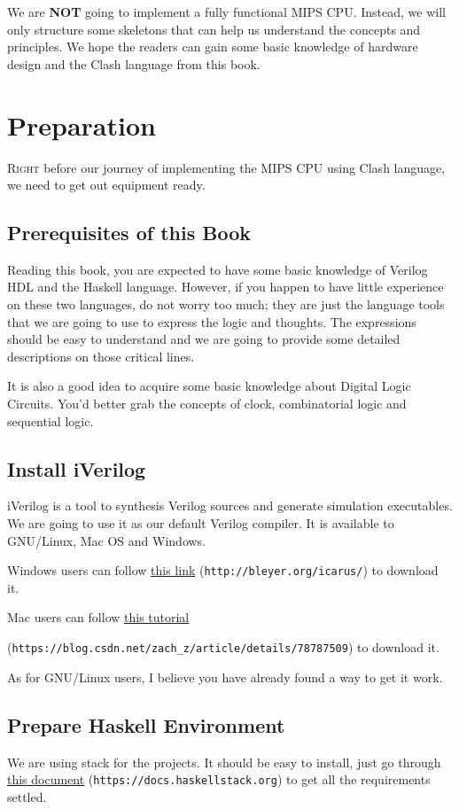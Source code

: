 \documentclass[a4paper,12pt, oneside]{book}
\begin{document}
We are \textbf{NOT} going to implement a fully functional MIPS CPU. Instead, we will only structure some skeletons that can help us understand the concepts and principles. We hope the readers can gain some basic knowledge of hardware design and the Clash language from this book.

\tableofcontents

\mainmatter
\chapter{Preparation}
\lettrine{R}{ight} before our journey of implementing the MIPS CPU using Clash language, we need to get out equipment ready.
\section{Prerequisites of this Book}
Reading this book, you are expected to have some basic knowledge of Verilog HDL and the Haskell language. However, if you happen to have little experience on these two languages, do not worry too much; they are just the language tools that we are going to use to express the logic and thoughts. The expressions should be easy to understand and we are going to provide some detailed descriptions on those critical lines.   

It is also a good idea to acquire some basic knowledge about Digital Logic Circuits. You'd better grab the concepts of clock, combinatorial logic and sequential logic.
\section{Install iVerilog}
iVerilog is a tool to synthesis Verilog sources and generate simulation executables. We are going to use it as our default Verilog compiler. It is available to GNU/Linux, Mac OS and Windows.

Windows users can follow \href{http://bleyer.org/icarus/}{this link} (\texttt{http://bleyer.org/icarus/}) to download it.

Mac users can follow \href{https://blog.csdn.net/zach_z/article/details/78787509}{this tutorial}

(\texttt{https://blog.csdn.net/zach_z/article/details/78787509}) to download it.

As for GNU/Linux users, I believe you have already found a way to get it work.

\section{Prepare Haskell Environment}
We are using stack for the projects. It should be easy to install, just go through \href{https://docs.haskellstack.org}{this document} (\texttt{https://docs.haskellstack.org}) to get all the requirements settled. 
\end{document}
